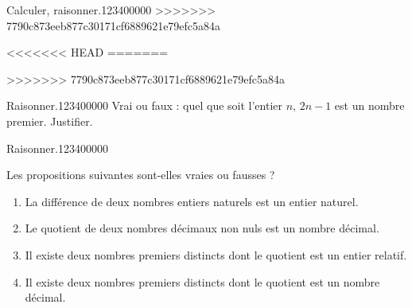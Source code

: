 \begin{pageAD}
\begin{ExoCad}{Calculer, raisonner.}{1234}{0}{0}{0}{0}{0}
>>>>>>> 7790c873eeb877c30171cf6889621e79efc5a84a

\end{ExoCad}


<<<<<<< HEAD
=======

>>>>>>> 7790c873eeb877c30171cf6889621e79efc5a84a
\begin{ExoCad}{Raisonner.}{1234}{0}{0}{0}{0}{0}
Vrai ou faux : quel que soit l'entier $n$, $2n-1$ est un nombre premier. Justifier.
\end{ExoCad}


 
\begin{ExoCad}{Raisonner.}{1234}{0}{0}{0}{0}{0}

Les propositions suivantes sont-elles vraies ou fausses ?
\begin{enumerate}[leftmargin=*]
\item La différence de deux nombres entiers naturels est un entier naturel. 
\item Le quotient de deux nombres décimaux non nuls est un nombre décimal.  
\item Il existe deux nombres premiers distincts dont le quotient est un
  entier relatif. 
\item Il existe deux nombres premiers distincts dont le quotient est un
  nombre décimal. 
\end{enumerate} 
 
 \end{ExoCad}
 
\end{pageAD}


